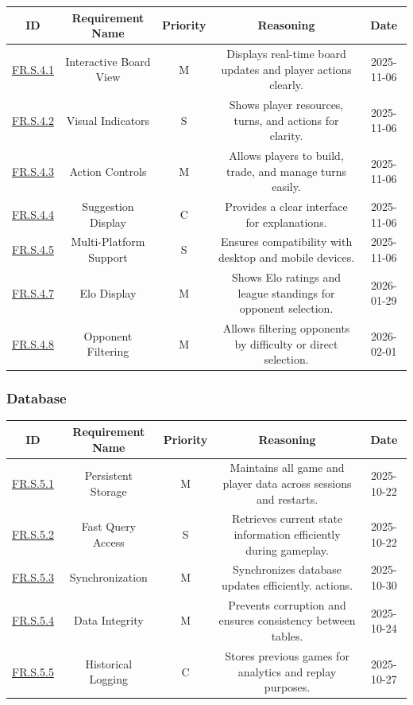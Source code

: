 \documentclass{article}
\begin{document}
\begin{tabular}{|c|c|c|c|c|}
\hline
\textbf{ID} & \textbf{Requirement Name} & \textbf{Priority} &
\textbf{Reasoning} & \textbf{Date} \\
\hline
\hyperref[FR.S.4.1]{FR.S.4.1} & Interactive Board View & M &
\parbox[t]{4cm}{Displays real-time board updates and player actions clearly.} &
2025-11-06 \\
\hline
\hyperref[FR.S.4.2]{FR.S.4.2} & Visual Indicators & S &
\parbox[t]{4cm}{Shows player resources, turns, and actions for clarity.} &
2025-11-06 \\
\hline
\hyperref[FR.S.4.3]{FR.S.4.3} & Action Controls & M &
\parbox[t]{4cm}{Allows players to build, trade, and manage turns easily.} &
2025-11-06 \\
\hline
\hyperref[FR.S.4.4]{FR.S.4.4} & \AI{} Suggestion Display & C &
\parbox[t]{4cm}{Provides a clear interface for \LLM{} explanations.} &
2025-11-06 \\
\hline
\hyperref[FR.S.4.5]{FR.S.4.5} & Multi-Platform Support & S &
\parbox[t]{4cm}{Ensures compatibility with desktop and mobile devices.} &
2025-11-06 \\
\hline
\hyperref[FR.S.4.7]{FR.S.4.7} & Elo Display & M &
\parbox[t]{4cm}{Shows Elo ratings and league standings for opponent selection.} &
2026-01-29 \\
\hline
\hyperref[FR.S.4.8]{FR.S.4.8} & Opponent Filtering & M &
\parbox[t]{4cm}{Allows filtering opponents by difficulty or direct selection.} &
2026-02-01 \\
\hline
\end{tabular}

\vspace{1em}

\subsubsection*{\GameState{} Database}

\begin{tabular}{|c|c|c|c|c|}
\hline
\textbf{ID} & \textbf{Requirement Name} & \textbf{Priority} &
\textbf{Reasoning} & \textbf{Date} \\
\hline
\hyperref[FR.S.5.1]{FR.S.5.1} & Persistent Storage & M &
\parbox[t]{4cm}{Maintains all game and player data across sessions
and restarts.} &
2025-10-22 \\
\hline
\hyperref[FR.S.5.2]{FR.S.5.2} & Fast Query Access & S &
\parbox[t]{4cm}{Retrieves current state information efficiently
during gameplay.} &
2025-10-22 \\
\hline
\hyperref[FR.S.5.3]{FR.S.5.3} & Synchronization & M &
\parbox[t]{4cm}{Synchronizes database updates efficiently.
actions.} &
2025-10-30 \\
\hline
\hyperref[FR.S.5.4]{FR.S.5.4} & Data Integrity & M &
\parbox[t]{4cm}{Prevents corruption and ensures consistency between
tables.} &
2025-10-24 \\
\hline
\hyperref[FR.S.5.5]{FR.S.5.5} & Historical Logging & C &
\parbox[t]{4cm}{Stores previous games for analytics and replay
purposes.} &
2025-10-27 \\
\hline
\end{tabular}
\end{document}
